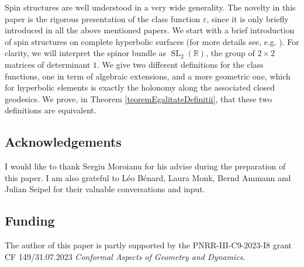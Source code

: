 \documentclass[12pt]{amsart}
\theoremstyle{definition}
\def\RR{{\mathbb R}}
\newcommand{\slinear}{\operatorname{SL}}
\begin{document}
Spin structures are well understood in a very wide generality. The novelty in this paper is the rigorous presentation of the class function $\varepsilon$, since it is only briefly introduced in all the above mentioned papers. We start with a brief introduction of spin structures on complete hyperbolic surfaces (for more details see, e.g. \cite{carteMoroianuSpinori, hitchin, lawsonMichelsohn}). For clarity, we will interpret the spinor bundle as $\slinear_2(\RR)$, the group of $2\times2$ matrices of determinant $1$. We give two different definitions for the class functions, one in term of algebraic extensions, and a more geometric one, which for hyperbolic elements is exactly the holonomy along the associated closed geodesics. We prove, in Theorem \ref{teoremEgalitateDefinitii}, that these two definitions are equivalent.

\subsection*{Acknowledgements} 
I would like to thank Sergiu Moroianu for his advise during the preparation of this paper. I am also grateful to Léo Bénard, Laura Monk, Bernd Ammann and Julian Seipel for their valuable conversations and input.

\subsection*{Funding}
The author of this paper is partly supported by the PNRR-III-C9-2023-I8 grant CF 149/31.07.2023 {\em Conformal Aspects of Geometry and Dynamics}.
\end{document}
